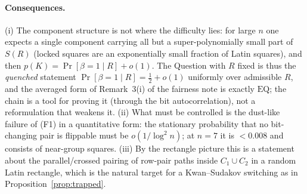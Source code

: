 \paragraph{Consequences.}  (i) The component structure is not where
the difficulty lies: for large $n$ one expects a single component
carrying all but a super-polynomially small part of $S(R)$ (locked
squares are an exponentially small fraction of Latin squares), and then
$p(K)=\Pr[\beta=1\mid R]+o(1)$.  The Question with $R$ fixed is thus
the \emph{quenched} statement $\Pr[\beta=1\mid R]=\tfrac12+o(1)$
uniformly over admissible $R$, and the averaged form of
Remark~3(i) of the fairness note is exactly $\mathrm{EQ}$; the chain is
a tool for proving it (through the bit autocorrelation), not a
reformulation that weakens it.  (ii) What must be controlled is the
dust-like failure of (F1) in a quantitative form: the stationary
probability that no bit-changing pair is flippable must be
$o(1/\log^2n)$; at $n=7$ it is $<0.008$ and consists of
near-group squares.  (iii) By the rectangle picture this is a statement
about the parallel/crossed pairing of row-pair paths inside
$C_1\cup C_2$ in a random Latin rectangle, which is the natural target
for a Kwan--Sudakov switching as in Proposition~\ref{prop:trapped}.

